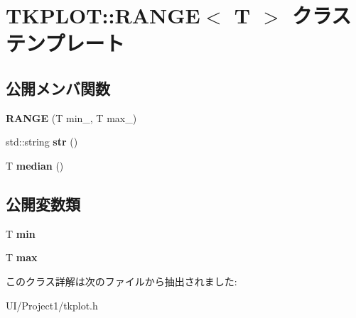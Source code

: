 \hypertarget{class_t_k_p_l_o_t_1_1_r_a_n_g_e}{}\section{T\+K\+P\+L\+OT\+:\+:R\+A\+N\+GE$<$ T $>$ クラステンプレート}
\label{class_t_k_p_l_o_t_1_1_r_a_n_g_e}
\subsection*{公開メンバ関数}
\begin{DoxyCompactItemize}
\item 
\mbox{\label{class_t_k_p_l_o_t_1_1_r_a_n_g_e_a15cccdb1c926b077c9f06173a5d144a5}} 
{\bfseries R\+A\+N\+GE} (T min\+\_\+, T max\+\_\+)
\item 
\mbox{\label{class_t_k_p_l_o_t_1_1_r_a_n_g_e_aada3563138773d6575a67eed99dc8c1b}} 
std\+::string {\bfseries str} ()
\item 
\mbox{\label{class_t_k_p_l_o_t_1_1_r_a_n_g_e_ace282f2a0952d3cca69702556ef92836}} 
T {\bfseries median} ()
\end{DoxyCompactItemize}
\subsection*{公開変数類}
\begin{DoxyCompactItemize}
\item 
\mbox{\label{class_t_k_p_l_o_t_1_1_r_a_n_g_e_af83dec2420b2e2d8629d212475a49fee}} 
T {\bfseries min}
\item 
\mbox{\label{class_t_k_p_l_o_t_1_1_r_a_n_g_e_a7100fa300f2cffeed4e5f0657afea787}} 
T {\bfseries max}
\end{DoxyCompactItemize}


このクラス詳解は次のファイルから抽出されました\+:\begin{DoxyCompactItemize}
\item 
U\+I/\+Project1/tkplot.\+h\end{DoxyCompactItemize}
